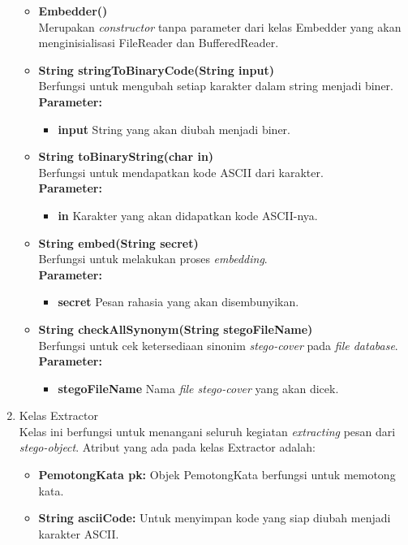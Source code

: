 \begin{enumerate}
\begin{itemize}
		\item \textbf{Embedder()}\\
		Merupakan \textit{constructor} tanpa parameter dari kelas Embedder yang akan menginisialisasi FileReader dan BufferedReader.
		
		\item \textbf{String stringToBinaryCode(String input)}\\
		Berfungsi untuk mengubah setiap karakter dalam string menjadi biner.\\
		\textbf{Parameter:}
		\begin{itemize}
			\item \textbf{input} String yang akan diubah menjadi biner.
		\end{itemize}
		
		\item \textbf{String toBinaryString(char in)}\\
		Berfungsi untuk mendapatkan kode ASCII dari karakter.\\
		\textbf{Parameter:}
		\begin{itemize}
			\item \textbf{in} Karakter yang akan didapatkan kode ASCII-nya.
		\end{itemize}
		
		\item \textbf{String embed(String secret)}\\
		Berfungsi untuk melakukan proses \textit{embedding}.\\
		\textbf{Parameter:}
		\begin{itemize}
			\item \textbf{secret} Pesan rahasia yang akan disembunyikan.
		\end{itemize}
		
		\item \textbf{String checkAllSynonym(String stegoFileName)}\\
		Berfungsi untuk cek ketersediaan sinonim \textit{stego-cover} pada \textit{file database}.\\
		\textbf{Parameter:}
		\begin{itemize}
			\item \textbf{stegoFileName} Nama \textit{file stego-cover} yang akan dicek.
		\end{itemize}
	\end{itemize}
	
	\item Kelas Extractor\\
	Kelas ini berfungsi untuk menangani seluruh kegiatan \textit{extracting} pesan dari \textit{stego-object}. Atribut yang ada pada kelas Extractor adalah:
	\begin{itemize}
		\item \textbf{PemotongKata pk:} Objek PemotongKata berfungsi untuk memotong kata.
		\item \textbf{String asciiCode:} Untuk menyimpan kode yang siap diubah menjadi karakter ASCII.
	\end{itemize}
	

\end{enumerate}
